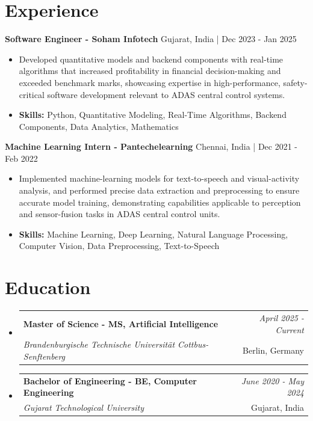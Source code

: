\documentclass[a4paper,11pt]{article}
\makeatletter
\newcommand{\resumeSubheading}[4]{
\vspace{0.5mm}\item
    \begin{tabular*}{\linewidth}[t]{l@{\extracolsep{\fill}}r}
        \textbf{#1} & \textit{\footnotesize{#4}} \\
        \textit{\footnotesize{#3}} &  \footnotesize{#2}\\
    \end{tabular*}
    \vspace{-2.4mm}
}
\makeatother
\begin{document}
\section{\textbf{Experience}}


\vspace{1mm}
  \textbf{Software Engineer - Soham Infotech} \hfill Gujarat, India | Dec 2023 - Jan 2025
\vspace{-1.5mm} %
\begin{itemize}
  \item Developed quantitative models and backend components with real-time algorithms that increased profitability in financial decision-making and exceeded benchmark marks, showcasing expertise in high-performance, safety-critical software development relevant to ADAS central control systems.

\vspace{-2mm}
  \item \textbf{Skills:} Python, Quantitative Modeling, Real-Time Algorithms, Backend Components, Data Analytics, Mathematics
\end{itemize}

\vspace{1mm}
  \textbf{Machine Learning Intern - Pantechelearning} \hfill Chennai, India | Dec 2021 - Feb 2022
\vspace{-1.5mm} %
\begin{itemize}
  \item Implemented machine-learning models for text-to-speech and visual-activity analysis, and performed precise data extraction and preprocessing to ensure accurate model training, demonstrating capabilities applicable to perception and sensor-fusion tasks in ADAS central control units.
\vspace{-2mm}
  \item \textbf{Skills:} Machine Learning, Deep Learning, Natural Language Processing, Computer Vision, Data Preprocessing, Text-to-Speech
\end{itemize}\section{\textbf{Education}}
\vspace{-0.4mm}

\begin{itemize}[leftmargin=0.15in, label={}]
\resumeSubheading
{Master of Science - MS, Artificial Intelligence }{Berlin, Germany}
{Brandenburgische Technische Universität Cottbus-Senftenberg  }{April 2025 - Current}

\vspace{1.0mm} %
\resumeSubheading
{Bachelor of Engineering - BE, Computer Engineering  }{Gujarat, India}
{Gujarat Technological University }{June 2020 - May 2024}

\end{itemize}
\end{document}
